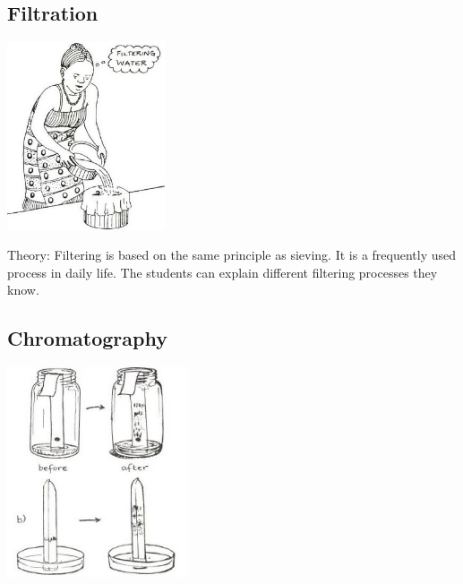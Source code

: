 \begin{multicols}{2}
\columnbreak

\subsection{Filtration} 

\begin{center}
\includegraphics[width=0.35\textwidth]{./img/source/filtering-2.jpg}
\end{center}

\begin{description*}
\item[Theory:]{Filtering is based on the same principle as
sieving. It is a frequently used process in daily
life. The students can explain different filtering
processes they know.}
\end{description*}

\subsection{Chromatography}  %

\begin{center}
\includegraphics[width=0.4\textwidth]{./img/source/chromatography-2.jpg} 
\end{center}


\end{multicols}
